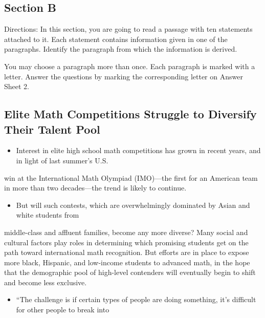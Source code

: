 \documentclass[UTF8,11pt]{ctexart}
\begin{document}
\subsection*{\textbf{Section B}}


Directions: In this section, you are going to read a passage with ten statements attached to it. Each statement contains information given in one of the paragraphs. Identify the paragraph from which the information is derived.


You may choose a paragraph more than once. Each paragraph is marked with a letter. Answer the questions by marking the corresponding letter on Answer Sheet 2.


\subsection*{\textbf{Elite Math Competitions Struggle to Diversify Their Talent Pool}}


\begin{itemize}[leftmargin=2em,itemsep=.2em,topsep=.4em]\item[A.] Interest in elite high school math competitions has grown in recent years, and in light of last summer’s U.S.
\end{itemize}

win at the International Math Olympiad (IMO)---the first for an American team in more than two decades—the trend is likely to continue.


\begin{itemize}[leftmargin=2em,itemsep=.2em,topsep=.4em]\item[B.] But will such contests, which are overwhelmingly dominated by Asian and white students from
\end{itemize}

middle-class and affluent families, become any more diverse? Many social and cultural factors play roles in determining which promising students get on the path toward international math recognition. But efforts are in place to expose more black, Hispanic, and low-income students to advanced math, in the hope that the demographic pool of high-level contenders will eventually begin to shift and become less exclusive.


\begin{itemize}[leftmargin=2em,itemsep=.2em,topsep=.4em]\item[C.] “The challenge is if certain types of people are doing something, it’s difficult for other people to break into
\end{itemize}
\end{document}
